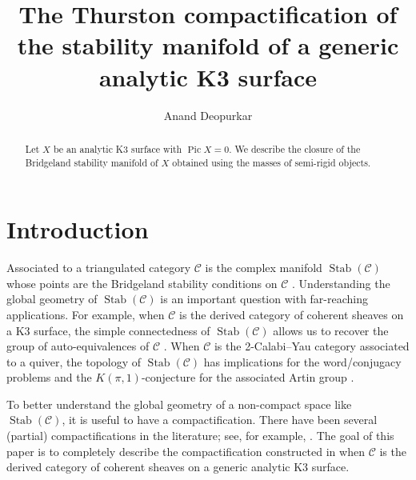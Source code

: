 \documentclass{amsart}
\title[Compactified stability manifold of a generic K3]{The Thurston compactification of the stability manifold of a generic analytic K3 surface}
\author{Anand Deopurkar}
\begin{document}
\maketitle
\begin{abstract}
  Let \(X\) be an analytic K3 surface with \(\operatorname{Pic} X = 0\).
  We describe the closure of the Bridgeland stability manifold of \(X\) obtained using the masses of semi-rigid objects.
\end{abstract}
\section{Introduction}
Associated to a triangulated category \(\mathcal{C}\) is the complex manifold \(\operatorname{Stab}(\mathcal{C})\) whose points are the Bridgeland stability conditions on \(\mathcal{C}\) \cite{bri:07}.
Understanding the global geometry of \(\operatorname{Stab}(\mathcal{C})\) is an important question with far-reaching applications.
For example, when \(\mathcal{C}\) is the derived category of coherent sheaves on a K3 surface, the simple connectedness of \(\operatorname{Stab}(\mathcal{C})\) allows us to recover the group of auto-equivalences of \(\mathcal{C}\) \cite{bay.bri:17}.
When \(\mathcal{C}\) is the 2-Calabi--Yau category associated to a quiver, the topology of \(\operatorname{Stab}(\mathcal{C})\) has implications for the word/conjugacy problems and the \(K(\pi,1)\)-conjecture  for the associated Artin group \cite{qiu.woo:18,hen.lic:24}.

To better understand the global geometry of a non-compact space like \(\operatorname{Stab}(\mathcal{C})\), it is useful to have a compactification.
There have been several (partial) compactifications in the literature; see, for example, \cite{bro.pau.plo.ea:22,bar.mol.so:23,bol:23,bap.deo.lic:20}.
The goal of this paper is to completely describe the compactification constructed in \cite{bap.deo.lic:20} when \(\mathcal{C}\) is the derived category of coherent sheaves on a generic analytic K3 surface.
\end{document}
